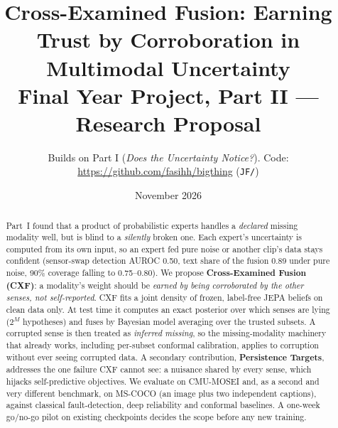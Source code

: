 \documentclass[10pt,twocolumn]{article}
\title{\vspace{-1.2em}\textbf{Cross-Examined Fusion: Earning Trust by Corroboration in Multimodal Uncertainty}\\[2pt]
\large Final Year Project, Part II --- Research Proposal}
\author{\small Builds on Part I (\emph{Does the Uncertainty Notice?}). Code: \url{https://github.com/fasihh/bigthing} (\texttt{JF/})}
\date{\small November 2026}
\begin{document}
\maketitle

\begin{abstract}
Part~I found that a product of probabilistic experts handles a \emph{declared} missing modality well, but is blind to a
\emph{silently} broken one. Each expert's uncertainty is computed from its own input, so an expert fed pure noise or
another clip's data stays confident (sensor-swap detection AUROC 0.50, text share of the fusion 0.89 under pure noise,
90\% coverage falling to 0.75--0.80). We propose \textbf{Cross-Examined Fusion (CXF)}: a modality's weight should be
\emph{earned by being corroborated by the other senses, not self-reported}. CXF fits a joint density of frozen,
label-free JEPA beliefs on clean data only. At test time it computes an exact posterior over which senses are lying
($2^M$ hypotheses) and fuses by Bayesian model averaging over the trusted subsets. A corrupted sense is then treated
as \emph{inferred missing}, so the missing-modality machinery that already works, including per-subset conformal
calibration, applies to corruption without ever seeing corrupted data. A secondary contribution,
\textbf{Persistence Targets}, addresses the one failure CXF cannot see: a nuisance shared by every sense, which
hijacks self-predictive objectives. We evaluate on CMU-MOSEI and, as a second and very different benchmark, on
MS-COCO (an image plus two independent captions), against classical fault-detection, deep reliability and conformal
baselines. A one-week go/no-go pilot on existing checkpoints decides the scope before any new training.
\end{abstract}
\end{document}
